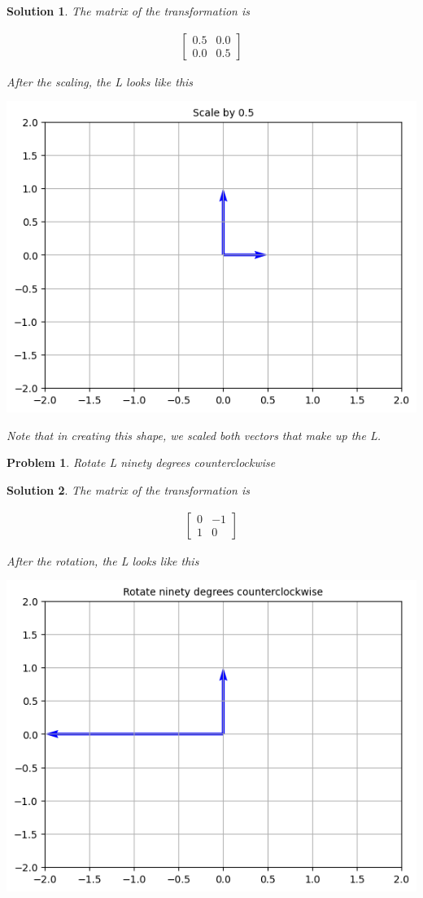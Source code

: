 \documentclass{article}
\newtheorem{problem}{Problem}
\newtheorem*{solution}{Solution}
\begin{document}
\begin{solution}
The matrix of the transformation is 

\begin{align*}
\begin{bmatrix}
0.5 & 0.0 \\ 
0.0 & 0.5
\end{bmatrix}
\end{align*}

After the scaling, the L looks like this

\includegraphics[scale=0.5, center]{Lscalebyhalf} 

Note that in creating this shape, we scaled both vectors that make up the L.

\end{solution}

\begin{problem}
Rotate L ninety degrees counterclockwise
\end{problem}

\begin{solution}
The matrix of the transformation is 

\begin{align*}
\begin{bmatrix}
0 & -1 \\ 
1 & 0
\end{bmatrix}
\end{align*}

After the rotation, the L looks like this

\includegraphics[scale=0.5, center]{Lrot90} 

\end{solution}
\end{document}
